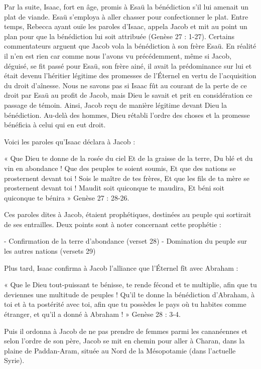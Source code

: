 Par la suite, Isaac, fort en âge, promis à Esaü la bénédiction s'il lui amenait un plat de viande. Esaü s'employa à aller chasser pour confectionner le plat. Entre temps, Rebecca ayant ouïe les paroles d'Isaac, appela Jacob et mit au point un plan pour que la bénédiction lui soit attribuée (Genèse 27 : 1-27). Certains commentateurs arguent que Jacob vola la bénédiction à son frère Esaü. En réalité il n'en est rien car comme nous l'avons vu précédemment, même si Jacob, déguisé, se fit passé pour Esaü, son frère ainé, il avait la prédominance sur lui et était devenu l'héritier légitime des promesses de l’Éternel en vertu de l'acquisition du droit d’aînesse. Nous ne savons pas si Isaac fût au courant de la perte de ce droit par Esaü au profit de Jacob, mais Dieu le savait et prit en considération ce passage de témoin. Ainsi, Jacob reçu de manière légitime devant Dieu la bénédiction. Au-delà des hommes, Dieu rétabli l'ordre des choses et la promesse bénéficia à celui qui en eut droit.

Voici les paroles qu'Isaac déclara à Jacob :

« Que Dieu te donne de la rosée du ciel Et de la graisse de la terre, Du blé et du vin en abondance ! Que des peuples te soient soumis, Et que des nations se prosternent devant toi ! Sois le maître de tes frères, Et que les fils de ta mère se prosternent devant toi ! Maudit soit quiconque te maudira, Et béni soit quiconque te bénira » Genèse 27 : 28-26.

Ces paroles dites à Jacob, étaient prophétiques, destinées au peuple qui sortirait de ses entrailles. Deux points sont à noter concernant cette prophétie :

- Confirmation de la terre d'abondance (verset 28)
- Domination du peuple sur les autres nations (versets 29)

Plus tard, Isaac confirma à Jacob l'alliance que l’Éternel fît avec Abraham :

« Que le Dieu tout-puissant te bénisse, te rende fécond et te multiplie, afin que tu deviennes une multitude de peuples ! Qu'il te donne la bénédiction d'Abraham, à toi et à ta postérité avec toi, afin que tu possèdes le pays où tu habites comme étranger, et qu'il a donné à Abraham ! » Genèse 28 : 3-4.

Puis il ordonna à Jacob de ne pas prendre de femmes parmi les cananéennes et selon l'ordre de son père, Jacob se mit en chemin pour aller à Charan, dans la plaine de Paddan-Aram, située au Nord de la Mésopotamie (dans l'actuelle Syrie).

